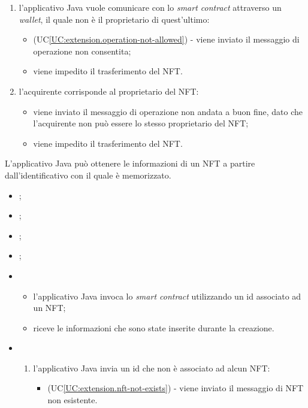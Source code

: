 \begin{itemize}
\begin{enumerate}[label=\lett]
    \item l'applicativo Java vuole comunicare con lo \textit{smart contract} attraverso un \textit{wallet}, il quale non è il proprietario di quest'ultimo:
    \begin{itemize}
      \item (UC\ref{UC:extension.operation-not-allowed}) - viene inviato il messaggio di operazione non consentita;
      \item viene impedito il trasferimento del NFT.
    \end{itemize}

    \item l'acquirente corrisponde al proprietario del NFT:
    \begin{itemize}
      \item viene inviato il messaggio di operazione non andata a buon fine, dato che l'acquirente non può essere lo stesso proprietario del NFT;
      \item viene impedito il trasferimento del NFT.
    \end{itemize}
  \end{enumerate}
\end{itemize}

\label{UC:get-nft-by-id}

L'applicativo Java può ottenere le informazioni di un NFT a partire dall'identificativo con il quale è memorizzato.

\begin{itemize}
  \item {};
  \item {};
  \item {};
  \item {};
  \item \UCMain
  \begin{itemize}
    \item l'applicativo Java invoca lo \textit{smart contract} utilizzando un id associato ad un NFT;
    \item riceve le informazioni che sono state inserite durante la creazione.
  \end{itemize}

  \item \UCExt
  \begin{enumerate}[label=\lett]
    \item l'applicativo Java invia un id che non è associato ad alcun NFT:
    \begin{itemize}
      \item (UC\ref{UC:extension.nft-not-exists}) - viene inviato il messaggio di NFT non esistente.
    \end{itemize}
  \end{enumerate}
\end{itemize}

